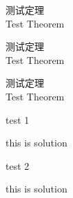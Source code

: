 \documentclass[cn,noanswer]{../../styles/book/elegantbook/elegantbook}
\begin{document}
\begin{property}
测试定理 \\
Test Theorem
\end{property}

\begin{remark}
测试定理 \\
Test Theorem
\end{remark}

\begin{solution}
测试定理 \\
Test Theorem
\end{solution}

\begin{problemset}
\item test 1
\begin{solution}
this is solution
\end{solution}
\item test 2
\begin{solution}
this is solution
\end{solution}
\end{problemset}
\end{document}
